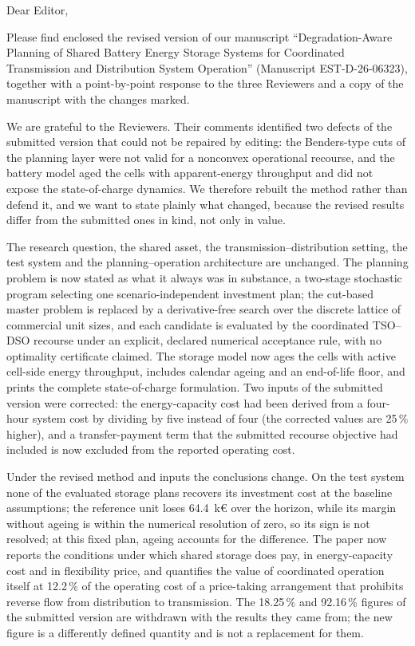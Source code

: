 \documentclass[12pt]{letter}
\begin{document}
\begin{letter}{}

    \opening{Dear Editor,}

    Please find enclosed the revised version of our manuscript ``Degradation-Aware Planning of Shared Battery Energy Storage Systems for Coordinated Transmission and Distribution System Operation'' (Manuscript EST-D-26-06323), together with a point-by-point response to the three Reviewers and a copy of the manuscript with the changes marked.

    We are grateful to the Reviewers. Their comments identified two defects of the submitted version that could not be repaired by editing: the Benders-type cuts of the planning layer were not valid for a nonconvex operational recourse, and the battery model aged the cells with apparent-energy throughput and did not expose the state-of-charge dynamics. We therefore rebuilt the method rather than defend it, and we want to state plainly what changed, because the revised results differ from the submitted ones in kind, not only in value.

    The research question, the shared asset, the transmission--distribution setting, the test system and the planning--operation architecture are unchanged. The planning problem is now stated as what it always was in substance, a two-stage stochastic program selecting one scenario-independent investment plan; the cut-based master problem is replaced by a derivative-free search over the discrete lattice of commercial unit sizes, and each candidate is evaluated by the coordinated TSO--DSO recourse under an explicit, declared numerical acceptance rule, with no optimality certificate claimed. The storage model now ages the cells with active cell-side energy throughput, includes calendar ageing and an end-of-life floor, and prints the complete state-of-charge formulation. Two inputs of the submitted version were corrected: the energy-capacity cost had been derived from a four-hour system cost by dividing by five instead of four (the corrected values are 25\,\% higher), and a transfer-payment term that the submitted recourse objective had included is now excluded from the reported operating cost.

    Under the revised method and inputs the conclusions change. On the test system none of the evaluated storage plans recovers its investment cost at the baseline assumptions; the reference unit loses 64.4~k\euro{} over the horizon, while its margin without ageing is within the numerical resolution of zero, so its sign is not resolved; at this fixed plan, ageing accounts for the difference. The paper now reports the conditions under which shared storage does pay, in energy-capacity cost and in flexibility price, and quantifies the value of coordinated operation itself at 12.2\,\% of the operating cost of a price-taking arrangement that prohibits reverse flow from distribution to transmission. The 18.25\,\% and 92.16\,\% figures of the submitted version are withdrawn with the results they came from; the new figure is a differently defined quantity and is not a replacement for them.


\end{letter}
\end{document}
